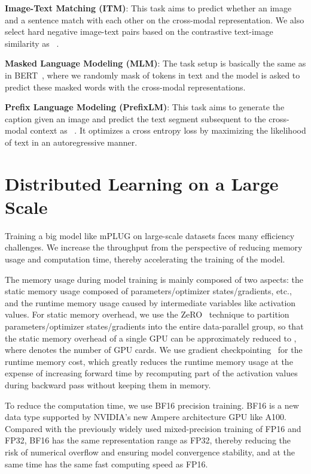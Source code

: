 \documentclass[11pt]{article}
\begin{document}
\textbf{Image-Text Matching (ITM)}: This task aims to predict whether an image and a sentence match with each other on the cross-modal representation. We also select hard negative image-text pairs based on the contrastive text-image similarity as ~\cite{li2021align}.

\textbf{Masked Language Modeling (MLM)}: The task setup is basically the same as in BERT~\cite{devlin2018bert}, where we randomly mask  of tokens in text and the model is asked to predict these masked words with the cross-modal representations.

\textbf{Prefix Language Modeling (PrefixLM)}: This task aims to generate the caption given an image and predict the text segment subsequent to the cross-modal context as ~\cite{bi2020palm}. It optimizes a cross entropy loss
by maximizing the likelihood of text in an autoregressive manner.

\section{Distributed Learning on a Large Scale} Training a big model like mPLUG on large-scale datasets faces many efficiency challenges. We increase the throughput from the perspective of reducing memory usage and computation time, thereby accelerating the training of the model.

The memory usage during model training is mainly composed of two aspects: the static memory usage composed of parameters/optimizer states/gradients, etc., and the runtime memory usage caused by intermediate variables like activation values.
For static memory overhead, we use the ZeRO~\cite{rajbhandari2020zero} technique to partition parameters/optimizer states/gradients into the entire data-parallel group, so that the static memory overhead of a single GPU can be approximately reduced to , where  denotes the number of GPU cards.
We use gradient checkpointing~\cite{chen2016training} for the runtime memory cost, which greatly reduces the runtime memory usage at the expense of increasing forward time by recomputing part of the activation values during backward pass without keeping them in memory.

To reduce the computation time, we use BF16 precision training. BF16 is a new data type supported by NVIDIA's new Ampere architecture GPU like A100. Compared with the previously widely used mixed-precision training of FP16 and FP32, BF16 has the same representation range as FP32, thereby reducing the risk of numerical overflow and ensuring model convergence stability, and at the same time has the same fast computing speed as FP16.
\end{document}
